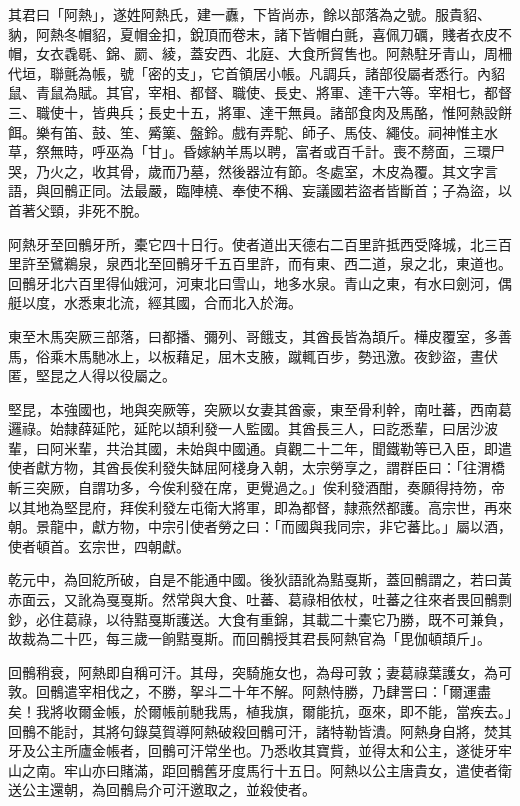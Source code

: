 \begin{pinyinscope}
 其君曰「阿熱」，遂姓阿熱氏，建一纛，下皆尚赤，餘以部落為之號。服貴貂、豽，阿熱冬帽貂，夏帽金扣，銳頂而卷末，諸下皆帽白氈，喜佩刀礪，賤者衣皮不帽，女衣毳毼、錦、罽、綾，蓋安西、北庭、大食所貿售也。阿熱駐牙青山，周柵代垣，聯氈為帳，號「密的支」，它首領居小帳。凡調兵，諸部役屬者悉行。內貂鼠、青鼠為賦。其官，宰相、都督、職使、長史、將軍、達干六等。宰相七，都督三、職使十，皆典兵；長史十五，將軍、達干無員。諸部食肉及馬酪，惟阿熱設餅餌。樂有笛、鼓、笙、觱篥、盤鈴。戲有弄駝、師子、馬伎、繩伎。祠神惟主水草，祭無時，呼巫為「甘」。昏嫁納羊馬以聘，富者或百千計。喪不剺面，三環尸哭，乃火之，收其骨，歲而乃墓，然後器泣有節。冬處室，木皮為覆。其文字言語，與回鶻正同。法最嚴，臨陣橈、奉使不稱、妄議國若盜者皆斷首；子為盜，以首著父頸，非死不脫。



 阿熱牙至回鶻牙所，橐它四十日行。使者道出天德右二百里許抵西受降城，北三百里許至鷿鵜泉，泉西北至回鶻牙千五百里許，而有東、西二道，泉之北，東道也。回鶻牙北六百里得仙娥河，河東北曰雪山，地多水泉。青山之東，有水曰劍河，偶艇以度，水悉東北流，經其國，合而北入於海。



 東至木馬突厥三部落，曰都播、彌列、哥餓支，其酋長皆為頡斤。樺皮覆室，多善馬，俗乘木馬馳冰上，以板藉足，屈木支腋，蹴輒百步，勢迅激。夜鈔盜，晝伏匿，堅昆之人得以役屬之。



 堅昆，本強國也，地與突厥等，突厥以女妻其酋豪，東至骨利幹，南吐蕃，西南葛邏祿。始隸薛延陀，延陀以頡利發一人監國。其酋長三人，曰訖悉輩，曰居沙波輩，曰阿米輩，共治其國，未始與中國通。貞觀二十二年，聞鐵勒等已入臣，即遣使者獻方物，其酋長俟利發失缽屈阿棧身入朝，太宗勞享之，謂群臣曰：「往渭橋斬三突厥，自謂功多，今俟利發在席，更覺過之。」俟利發酒酣，奏願得持笏，帝以其地為堅昆府，拜俟利發左屯衛大將軍，即為都督，隸燕然都護。高宗世，再來朝。景龍中，獻方物，中宗引使者勞之曰：「而國與我同宗，非它蕃比。」屬以酒，使者頓首。玄宗世，四朝獻。



 乾元中，為回紇所破，自是不能通中國。後狄語訛為黠戛斯，蓋回鶻謂之，若曰黃赤面云，又訛為戛戛斯。然常與大食、吐蕃、葛祿相依杖，吐蕃之往來者畏回鶻剽鈔，必住葛祿，以待黠戛斯護送。大食有重錦，其載二十橐它乃勝，既不可兼負，故裁為二十匹，每三歲一餉黠戛斯。而回鶻授其君長阿熱官為「毘伽頓頡斤」。



 回鶻稍衰，阿熱即自稱可汗。其母，突騎施女也，為母可敦；妻葛祿葉護女，為可敦。回鶻遣宰相伐之，不勝，挐斗二十年不解。阿熱恃勝，乃肆詈曰：「爾運盡矣！我將收爾金帳，於爾帳前馳我馬，植我旗，爾能抗，亟來，即不能，當疾去。」回鶻不能討，其將句錄莫賀導阿熱破殺回鶻可汗，諸特勒皆潰。阿熱身自將，焚其牙及公主所廬金帳者，回鶻可汗常坐也。乃悉收其寶貲，並得太和公主，遂徙牙牢山之南。牢山亦曰賭滿，距回鶻舊牙度馬行十五日。阿熱以公主唐貴女，遣使者衛送公主還朝，為回鶻烏介可汗邀取之，並殺使者。




\end{pinyinscope}
